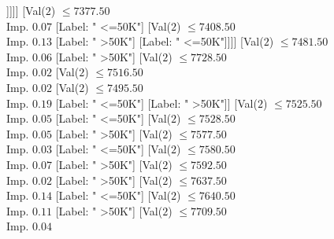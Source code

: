 \documentclass[margin=10pt]{standalone}
\begin{document}
\begin{forest}
																										[Label: " <=50K"]
																										[Val($2$) $ \leq 7173.50$ \\ Imp. $0.03$
																											[Label: " <=50K"]
																											[Val($2$) $ \leq 7194.50$ \\ Imp. $0.02$
																												[Label: " >50K"]
																												[Val($2$) $ \leq 7206.50$ \\ Imp. $0.25$
																													[Label: " >50K"]
																													[Label: " <=50K"]]]]]
																									[Val($2$) $ \leq 7377.50$ \\ Imp. $0.07$
																										[Label: " <=50K"]
																										[Val($2$) $ \leq 7408.50$ \\ Imp. $0.13$
																											[Label: " >50K"]
																											[Label: " <=50K"]]]]
																								[Val($2$) $ \leq 7481.50$ \\ Imp. $0.06$
																									[Label: " >50K"]
																									[Val($2$) $ \leq 7728.50$ \\ Imp. $0.02$
																										[Val($2$) $ \leq 7516.50$ \\ Imp. $0.02$
																											[Val($2$) $ \leq 7495.50$ \\ Imp. $0.19$
																												[Label: " <=50K"]
																												[Label: " >50K"]]
																											[Val($2$) $ \leq 7525.50$ \\ Imp. $0.05$
																												[Label: " <=50K"]
																												[Val($2$) $ \leq 7528.50$ \\ Imp. $0.05$
																													[Label: " >50K"]
																													[Val($2$) $ \leq 7577.50$ \\ Imp. $0.03$
																														[Label: " <=50K"]
																														[Val($2$) $ \leq 7580.50$ \\ Imp. $0.07$
																															[Label: " >50K"]
																															[Val($2$) $ \leq 7592.50$ \\ Imp. $0.02$
																																[Label: " >50K"]
																																[Val($2$) $ \leq 7637.50$ \\ Imp. $0.14$
																																	[Label: " <=50K"]
																																	[Val($2$) $ \leq 7640.50$ \\ Imp. $0.11$
																																		[Label: " >50K"]
																																		[Val($2$) $ \leq 7709.50$ \\ Imp. $0.04$

\end{forest}
\end{document}
